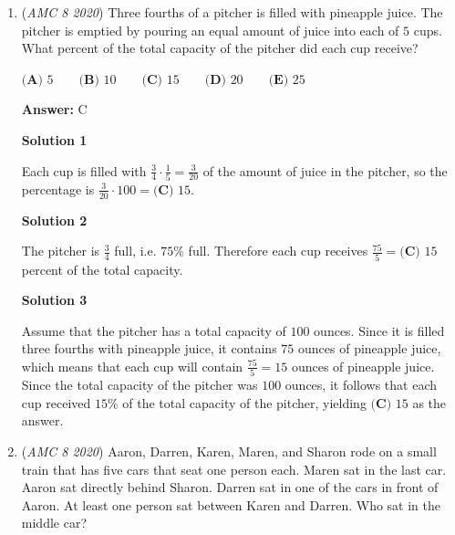 \begin{enumerate}
The first hexagon has $1$ dot in it. The second hexagon has $7$ dots in it. The third hexagon has $19$ dots on it. From the first to the second, we add $6$ hexagons. From the second to the third, we add $12$ hexagons. Therefore, recognizing the pattern, from the third to the fourth case, we have to add $18$ dots to the $19$ we already have, resulting in our answer of $\boxed{\textbf{(B) }37}$ dots.

 


	\item (\textit{AMC 8 2020}) Three fourths of a pitcher is filled with pineapple juice. The pitcher is emptied by pouring an equal amount of juice into each of $5$ cups. What percent of the total capacity of the pitcher did each cup receive? 


 $\textbf{(A) }5 \qquad \textbf{(B) }10 \qquad \textbf{(C) }15 \qquad \textbf{(D) }20 \qquad \textbf{(E) }25$

 \textbf{Answer: }C



\textbf{Solution 1}

Each cup is filled with $\frac{3}{4} \cdot \frac{1}{5} = \frac{3}{20}$ of the amount of juice in the pitcher, so the percentage is $\frac{3}{20} \cdot 100 = \boxed{\textbf{(C) }15}$.

 



\textbf{Solution 2}

The pitcher is $\frac{3}{4}$ full, i.e. $75\%$ full. Therefore each cup receives $\frac{75}{5}=\boxed{\textbf{(C) }15}$ percent of the total capacity.

 



\textbf{Solution 3}

Assume that the pitcher has a total capacity of $100$ ounces. Since it is filled three fourths with pineapple juice, it contains $75$ ounces of pineapple juice, which means that each cup will contain $\frac{75}{5}=15$ ounces of pineapple juice. Since the total capacity of the pitcher was $100$ ounces, it follows that each cup received $15\%$ of the total capacity of the pitcher, yielding $\boxed{\textbf{(C) }15}$ as the answer.

 


	\item (\textit{AMC 8 2020}) Aaron, Darren, Karen, Maren, and Sharon rode on a small train that has five cars that seat one person each. Maren sat in the last car. Aaron sat directly behind Sharon. Darren sat in one of the cars in front of Aaron. At least one person sat between Karen and Darren. Who sat in the middle car?



\end{enumerate}
